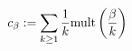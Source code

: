 \begin{equation}\label{Peterson2}
c_\beta:= \sum_{k\geq 1} \frac1{k} {{\rm mult}} \left( \frac{\beta}{k} \right)
\end{equation}

